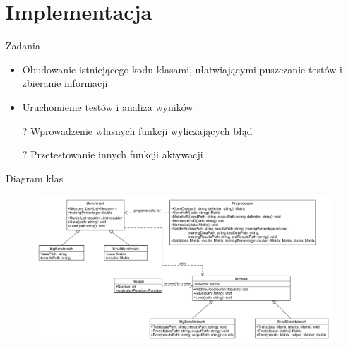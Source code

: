 \documentclass{beamer}
\begin{document}
\section{Implementacja}
\begin{frame}{Zadania}
\begin{itemize}
\item Obudowanie istniejącego kodu klasami, ułatwiającymi puszczanie testów i zbieranie informacji
\item Uruchomienie testów i analiza wyników
\item[?] Wprowadzenie własnych funkcji wyliczających błąd 
\item[?] Przetestowanie innych funkcji aktywacji
\end{itemize}
\end{frame}

\begin{frame}{Diagram klas}
\begin{figure}
	\includegraphics[scale=0.26]{classes.png}
\end{figure}
\end{frame}
\end{document}
